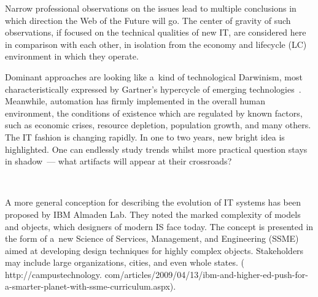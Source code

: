 \begin{multicols}{2}
 Narrow professional observations on the issues lead to multiple conclusions in which direction the Web of
the Future will go. The center of gravity of such observations, if focused on the technical qualities of new
IT, are considered here in comparison with each other, in isolation from
the economy and lifecycle (LC) environment
in which they operate.

 Dominant approaches are looking like a~kind of technological Darwinism, most characteristically
expressed by Gartner's hypercycle of emerging technologies~\cite{1-sor}. Meanwhile,
 automation has
firmly implemented in the overall human environment, the conditions of existence
which are regulated by
known factors, such as economic crises, resource depletion, population growth,
and many others. The IT
fashion is changing rapidly. In one to two years, new bright idea is highlighted.
One can endlessly study
trends whilst more practical question stays in shadow~--- what artifacts will appear at their crossroads?

   \begin{figure*} %
      \vspace*{1pt}
 \begin{center}
 \mbox{%
 \epsfxsize=103.339mm
 }
 \end{center}
 \vspace*{-9pt}
\vspace*{6pt}
\end{figure*}

 A more general conception for describing the evolution of IT systems has been proposed by IBM
Almaden Lab. They noted the marked complexity of models and objects, which designers of modern
IS face today. The concept is presented in the form of a~new Science of Services,
Management, and Engineering (SSME) aimed at developing design techniques for highly complex objects.
Stakeholders may include large organizations, cities, and even whole states. ({\sf
http://campustechnology. com/articles/2009/04/13/ibm-and-higher-ed-push-for-a-smarter-planet-with-ssme-curriculum.aspx}).


\end{multicols}
